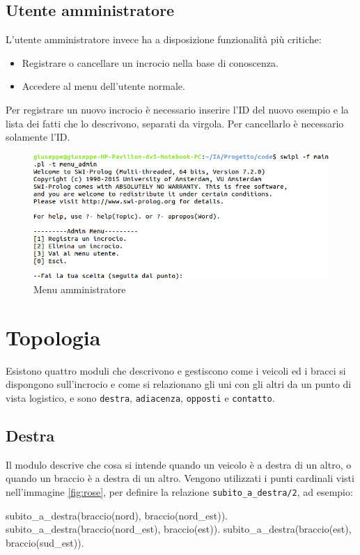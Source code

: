 \subsection{Utente amministratore}
L'utente amministratore invece ha a disposizione funzionalità più critiche:
\begin{itemize}
	\item Registrare o cancellare un incrocio nella base di conoscenza.
	\item Accedere al menu dell'utente normale.
\end{itemize}

Per registrare un nuovo incrocio è necessario inserire l'ID del nuovo esempio e la lista dei fatti che lo descrivono, separati da virgola. Per cancellarlo è necessario solamente l'ID.

\begin{figure}[!hbtp]
	\includegraphics[width=\textwidth]{images/admin}
	\caption{Menu amministratore}
\end{figure}

\section{Topologia}
Esistono quattro moduli che descrivono e gestiscono come i veicoli ed i bracci si dispongono sull'incrocio e come si relazionano gli uni con gli altri da un punto di vista logistico, e sono \texttt{destra}, \texttt{adiacenza}, \texttt{opposti} e \texttt{contatto}.

\subsection{Destra}
\label{ssec:right}
Il modulo descrive che cosa si intende quando un veicolo è a destra di un altro, o quando un braccio è a destra di un altro. Vengono utilizzati i punti cardinali visti nell'immagine \ref{fig:rose}, per definire la relazione \texttt{subito\_a\_destra/2}, ad esempio:
\begin{verbatimtab}
subito_a_destra(braccio(nord), braccio(nord_est)).
subito_a_destra(braccio(nord_est), braccio(est)).
subito_a_destra(braccio(est), braccio(sud_est)).	
\end{verbatimtab}


